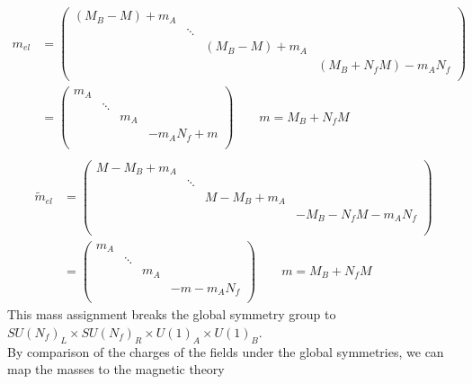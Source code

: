 \begin{align}
m_{el} &= 
\begin{pmatrix}
   (M_B - M)  + m_A \\ &  \ddots 
   \\ 
   &  & (M_B - M)  + m_A \\
   &  &  & (M_B + N_f M) - m_A N_f  \\
  \end{pmatrix} \\
& = 
\begin{pmatrix}
   m_A \\ &  \ddots 
   \\ 
    & & m_A \\
    & &  & - m_A N_f + m  \\
  \end{pmatrix} \qquad m = M_B + N_f M\\
  \end{align}
  \begin{align}
\tilde{m}_{el} &= 
\begin{pmatrix}
%
M -M_B   + m_A \\ & \ddots \\ & &  M -M_B   + m_A \\
& & &  - M_B -  N_f M - m_A N_f \\
\\
\end{pmatrix}
\\
&= 
 \begin{pmatrix}
  m_A \\ & \ddots \\ & &  m_A \\ & &  &  - m - m_A N_f \\     
 \end{pmatrix}
  \qquad m = M_B + N_f M
 \label{eqn:real_mass_reduction_el}
\end{align}
This mass assignment breaks the global symmetry group to $SU(N_f)_L \times SU(N_f)_R \times U(1)_A \times U(1)_B$.\\
By comparison of the charges of the fields under the global symmetries, we can map the masses to the magnetic theory

